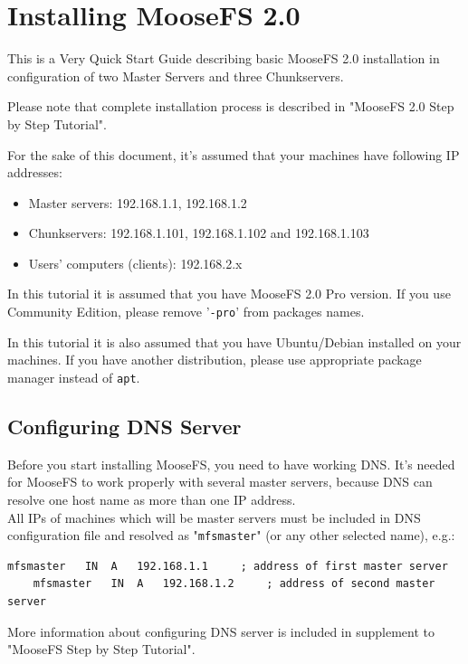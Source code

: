 \documentclass[a4paper,11pt,english]{report}
\def\code#1{\texttt{#1}}
\begin{document}
	\chapter{Installing MooseFS 2.0}
	This is a Very Quick Start Guide describing basic MooseFS 2.0 installation in configuration of two Master Servers and three Chunkservers.
	
	Please note that complete installation process is described in "MooseFS 2.0 Step by Step Tutorial".
	
	For the sake of this document, it's assumed that your machines have following IP addresses:
	\begin{itemize}
		\item Master servers: 192.168.1.1, 192.168.1.2
		\item Chunkservers: 192.168.1.101, 192.168.1.102 and 192.168.1.103
		\item Users' computers (clients): 192.168.2.x
	\end{itemize}

	\bigskip
	\bigskip
	\bigskip
	In this tutorial it is assumed that you have MooseFS 2.0 Pro version. If you use Community Edition, please remove '\code{-pro}' from packages names.
	
	\bigskip
	In this tutorial it is also assumed that you have Ubuntu/Debian installed on your machines. If you have another distribution, please use appropriate package manager instead of \code{apt}.	
		
		\section{Configuring DNS Server}
		Before you start installing MooseFS, you need to have working DNS. It's needed for MooseFS to work properly with several master servers, because DNS can resolve one host name as more than one IP address. \\
		All IPs of machines which will be master servers must be included in DNS configuration file and resolved as "\code{mfsmaster}" (or any other selected name), e.g.:

		\begin{lstlisting}[caption={DNS entries}]
	mfsmaster	IN	A	192.168.1.1		; address of first master server
	mfsmaster	IN	A	192.168.1.2		; address of second master server
		\end{lstlisting}
		
More information about configuring DNS server is included in supplement to "MooseFS Step by Step Tutorial".
		
\end{document}
